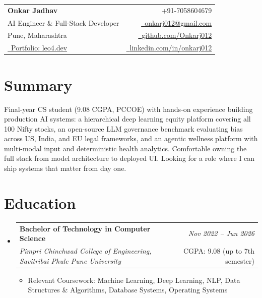 \documentclass[a4paper,10.5pt]{article}
\makeatletter
\newcommand{\resumeSubheading}[4]{
\vspace{0.8mm}\item
    \begin{tabular*}{0.98\textwidth}[t]{l@{\extracolsep{\fill}}r}
        \textbf{#1} & \textit{\footnotesize{#4}} \\
        \textit{\footnotesize{#3}} & \footnotesize{#2}\\
    \end{tabular*}
    \vspace{-2.0mm}
}
\newcommand{\resumeSubHeadingListStart}{\begin{itemize}[leftmargin=0mm,label={}]}
\newcommand{\resumeItemListStart}{\begin{justify}\begin{itemize}[leftmargin=3ex, rightmargin=2ex, noitemsep, labelsep=1.2mm, itemsep=0.4mm]\small}
\newcommand{\resumeSubHeadingListEnd}{\end{itemize}\vspace{2mm}}
\newcommand{\resumeItemListEnd}{\end{itemize}\end{justify}\vspace{-2mm}}
\newcommand{\name}{Onkar Jadhav}
\newcommand{\phone}{7058604679}
\newcommand{\emaila}{onkarj012@gmail.com}
\newcommand{\github}{github.com/Onkarj012}
\newcommand{\linkedin}{linkedin.com/in/onkarj012}
\makeatother
\begin{document}
\selectfont

\begin{tabularx}{\linewidth}{L r}
  \textbf{\Large \name} & {\raisebox{0.0\height}{\footnotesize \faPhone}\ +91-\phone}\\
  {AI Engineer \& Full-Stack Developer} &
  \href{mailto:\emaila}{\raisebox{0.0\height}{\footnotesize \faEnvelope}\ {\emaila}} \\
  {Pune, Maharashtra} &
  \href{https://\github}{\raisebox{0.0\height}{\footnotesize \faGithub}\ {\github}} \\
  {\href{https://leo4.dev}{\raisebox{0.0\height}{\footnotesize \faGlobe}\ Portfolio: leo4.dev}} &
  \href{https://\linkedin}{\raisebox{0.0\height}{\footnotesize \faLinkedin}\ {\linkedin}}
\end{tabularx}
\vspace{-4mm}

\section{\textbf{Summary}}
\vspace{1mm}
\small{
Final-year CS student (9.08 CGPA, PCCOE) with hands-on experience building production AI systems: a hierarchical deep learning equity platform covering all 100 Nifty stocks, an open-source LLM governance benchmark evaluating bias across US, India, and EU legal frameworks, and an agentic wellness platform with multi-modal input and deterministic health analytics. Comfortable owning the full stack from model architecture to deployed UI. Looking for a role where I can ship systems that matter from day one.
}
\vspace{-3mm}

\section{\textbf{Education}}
  \resumeSubHeadingListStart
    \resumeSubheading
      {Bachelor of Technology in Computer Science}{CGPA: 9.08 (up to 7th semester)}
      {Pimpri Chinchwad College of Engineering, Savitribai Phule Pune University}{Nov 2022 -- Jun 2026}
      \resumeItemListStart
        \item {Relevant Coursework: Machine Learning, Deep Learning, NLP, Data Structures \& Algorithms, Database Systems, Operating Systems}
      \resumeItemListEnd
\resumeSubHeadingListEnd
\vspace{-6mm}
\end{document}
